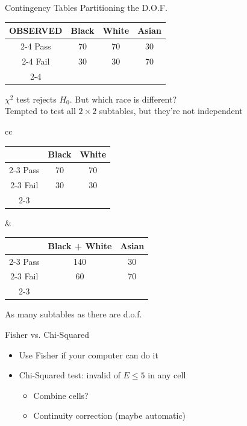 \begin{frame}{Contingency Tables}
Partitioning the D.O.F.\\
\begin{center}
    \begin{tabular}{c|c|c|c|}
         OBSERVED & Black & White & Asian \\   
         \cline{2-4}
         Pass & 70 & 70 & 30 \\
         \cline{2-4}
         Fail & 30 & 30 & 70 \\
         \cline{2-4}
    \end{tabular}
\end{center}
$\chi^2$ test rejects $H_0$. But which race is different?\\
Tempted to test all $2\times 2$ subtables, but they're not independent
\br
\begin{center}
\begin{tabular}{cc}
         \begin{tabular}{c|c|c|}
          & Black & White \\   
         \cline{2-3}
         Pass & 70 & 70  \\
         \cline{2-3}
         Fail & 30 & 30 \\
         \cline{2-3}
    \end{tabular}
    &
    \begin{tabular}{c|c|c|}
          & Black + White & Asian \\   
         \cline{2-3}
         Pass & 140 & 30  \\
         \cline{2-3}
         Fail & 60 & 70 \\
         \cline{2-3}
    \end{tabular}
\end{tabular}
\end{center}
As many subtables as there are d.o.f.
\end{frame}

\begin{frame}{Fisher vs. Chi-Squared}
    \begin{itemize}
        \item Use Fisher if your computer can do it
        \item Chi-Squared test: invalid of $E\leq 5$ in any cell
        \begin{itemize}
            \item Combine cells?
            \item Continuity correction (maybe automatic)
        \end{itemize}
    \end{itemize}
\end{frame}

